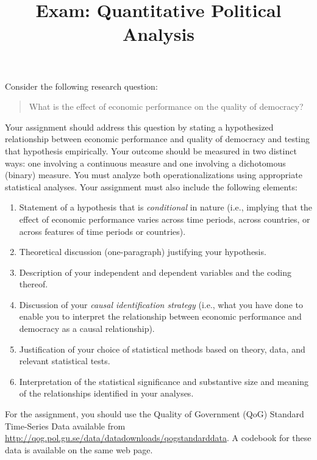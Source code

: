 \documentclass[a4paper,12pt]{article}
\title{Exam: Quantitative Political Analysis}
\author{}
\date{}
\begin{document}
\maketitle

\vspace{-3em}

\onehalfspacing

\noindent Consider the following research question:

\begin{quote}
What is the effect of economic performance on the quality of democracy?
\end{quote}

\noindent Your assignment should address this question by stating a hypothesized relationship between economic performance and quality of democracy and testing that hypothesis empirically. Your outcome should be measured in two distinct ways: one involving a continuous measure and one involving a dichotomous (binary) measure. You must analyze both operationalizations using appropriate statistical analyses. Your assignment must also include the following elements:

\begin{enumerate}
\item Statement of a hypothesis that is \textit{conditional} in nature (i.e., implying that the effect of economic performance varies across time periods, across countries, or across features of time periods or countries). 
\item Theoretical discussion (one-paragraph) justifying your hypothesis.
\item Description of your independent and dependent variables and the coding thereof.
\item Discussion of your \textit{causal identification strategy} (i.e., what you have done to enable you to interpret the relationship between economic performance and democracy as a causal relationship).
\item Justification of your choice of statistical methods based on theory, data, and relevant statistical tests.
\item Interpretation of the statistical significance and substantive size and meaning of the relationships identified in your analyses.
\end{enumerate}

\noindent For the assignment, you should use the Quality of Government (QoG) Standard Time-Series Data available from \url{http://qog.pol.gu.se/data/datadownloads/qogstandarddata}. A codebook for these data is available on the same web page.
\end{document}
